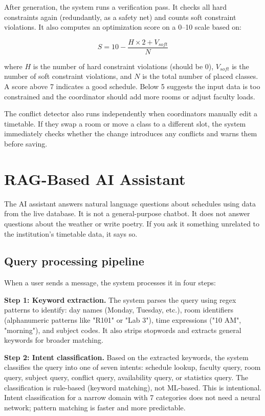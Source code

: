 \documentclass[conference]{IEEEtran}
\begin{document}
After generation, the system runs a verification pass. It checks all hard constraints again (redundantly, as a safety net) and counts soft constraint violations. It also computes an optimization score on a 0--10 scale based on:

\begin{equation}
S = 10 - \frac{H \times 2 + V_{soft}}{N}
\end{equation}

where $H$ is the number of hard constraint violations (should be 0), $V_{soft}$ is the number of soft constraint violations, and $N$ is the total number of placed classes. A score above 7 indicates a good schedule. Below 5 suggests the input data is too constrained and the coordinator should add more rooms or adjust faculty loads.

The conflict detector also runs independently when coordinators manually edit a timetable. If they swap a room or move a class to a different slot, the system immediately checks whether the change introduces any conflicts and warns them before saving.


\section{RAG-Based AI Assistant}

The AI assistant answers natural language questions about schedules using data from the live database. It is not a general-purpose chatbot. It does not answer questions about the weather or write poetry. If you ask it something unrelated to the institution's timetable data, it says so.

\subsection{Query processing pipeline}

When a user sends a message, the system processes it in four steps:

\textbf{Step 1: Keyword extraction.} The system parses the query using regex patterns to identify: day names (Monday, Tuesday, etc.), room identifiers (alphanumeric patterns like "R101" or "Lab 3"), time expressions ("10 AM", "morning"), and subject codes. It also strips stopwords and extracts general keywords for broader matching.

\textbf{Step 2: Intent classification.} Based on the extracted keywords, the system classifies the query into one of seven intents: schedule lookup, faculty query, room query, subject query, conflict query, availability query, or statistics query. The classification is rule-based (keyword matching), not ML-based. This is intentional. Intent classification for a narrow domain with 7 categories does not need a neural network; pattern matching is faster and more predictable.
\end{document}
